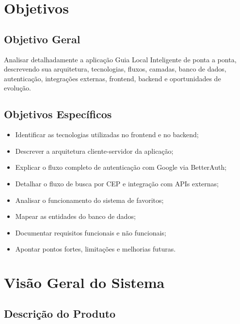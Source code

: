 \documentclass[
    12pt,
    oneside,
    openright,
    a4paper,
    english,
    brazil
]{abntex2}
\begin{document}

\chapter{Objetivos}

\section{Objetivo Geral}

Analisar detalhadamente a aplicação Guia Local Inteligente de ponta a ponta, descrevendo sua arquitetura, tecnologias, fluxos, camadas, banco de dados, autenticação, integrações externas, frontend, backend e oportunidades de evolução.

\section{Objetivos Específicos}

\begin{itemize}
    \item Identificar as tecnologias utilizadas no frontend e no backend;
    \item Descrever a arquitetura cliente-servidor da aplicação;
    \item Explicar o fluxo completo de autenticação com Google via BetterAuth;
    \item Detalhar o fluxo de busca por CEP e integração com APIs externas;
    \item Analisar o funcionamento do sistema de favoritos;
    \item Mapear as entidades do banco de dados;
    \item Documentar requisitos funcionais e não funcionais;
    \item Apontar pontos fortes, limitações e melhorias futuras.
\end{itemize}


\chapter{Visão Geral do Sistema}

\section{Descrição do Produto}
\end{document}
